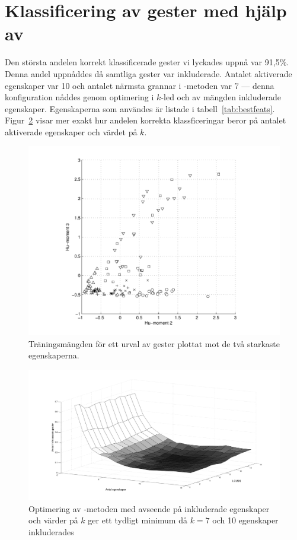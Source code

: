 \documentclass[../rapport_MVEX01-11-05]{subfiles}
\begin{document}
\section{Klassificering av gester med hjälp av \knn}
Den största andelen korrekt klassificerade gester vi lyckades uppnå var 91,5\%.
Denna andel uppnåddes då samtliga gester var inkluderade. Antalet aktiverade
egenskaper var 10 och antalet närmsta grannar i \knn-metoden var 7 --- denna
konfiguration nåddes genom optimering i $k$-led och av mängden inkluderade
egenskaper. Egenskaperna som
användes är listade i tabell~\ref{tab:bestfeats}.
Figur~\ref{fig:knn-optimering} visar mer exakt hur andelen korrekta
klassficeringar beror på antalet aktiverade egenskaper och värdet på $k$.

\begin{figure}[tbp]
  \centering
  \includegraphics[width=\textwidth,trim=2cm 0.5cm 2cm 0,clip=true]{bilder/feats-10+11}
  \caption{Träningsmängden för ett urval av gester plottat mot de två starkaste
  egenskaperna. }
  \label{fig:feats1011}
\end{figure}

\begin{figure}[tbp]
    \begin{center}
        \includegraphics[trim=2cm 2cm 2cm 1.8cm,width=\columnwidth,clip=true]{bilder/knn_optimering}
    \end{center}
    \caption{Optimering av \knn-metoden med avseende på inkluderade egenskaper
och värder på $k$ ger ett tydligt minimum då $k=7$ och 10 egenskaper inkluderades}
    \label{fig:knn-optimering}
\end{figure}
\end{document}

